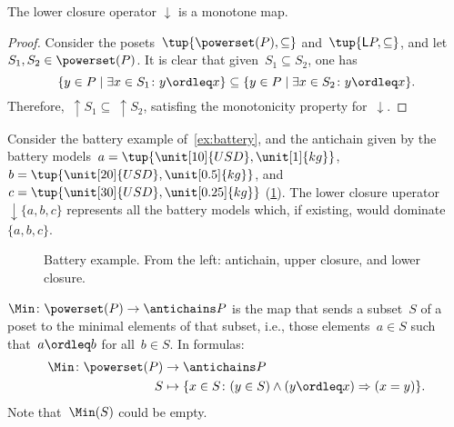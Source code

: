 \begin{lemma}
The lower closure operator $\downarrow$ is a monotone map.
\end{lemma}

\begin{proof}
Consider the posets~$\tup{\powerset(P),\subseteq}$ and~$\tup{\mathsf{L}P,\subseteq}$, and let~$S_1,S_2\in \powerset(P)$. It is clear that given~$S_1\subseteq S_2$, one has
\begin{equation}
    \{y\in P\mid \exists x\in S_1\colon y\ordleq x\} \subseteq \{y\in P\mid \exists x\in S_2\colon y\ordleq x\}.
\end{equation}
Therefore,~$\uparrow S_1\subseteq \ \uparrow S_2$, satisfing the monotonicity property for~$\downarrow$.
\end{proof}



\begin{example}
Consider the battery example of~\cref{ex:battery}, and the antichain given by the battery models~$a=\tup{\unit[10]{USD},\unit[1]{kg}}$,~$b=\tup{\unit[20]{USD},\unit[0.5]{kg}}$, and~$c=\tup{\unit[30]{USD},\unit[0.25]{kg}}$ (\cref{fig:examplebatt}).
The lower closure uperator~$\downarrow\{a,b,c\}$ represents all the battery models which, if existing, would dominate~$\{a,b,c\}$.

\end{example}
\begin{figure}[h!]
    \begin{center}
    \end{center}
    \caption{Battery example. From the left: antichain, upper closure, and lower closure.
        \label{fig:examplebatt}}
\end{figure}


\begin{definition}[Min]
\label{def:Min}
$\Min \colon \powerset(P) \to \antichains P$ is the map that sends a subset~$S$ of a poset to the minimal elements of that subset, i.e., those elements~$a \in S$ such that~$a \ordleq b$ for all~$b \in S$. In formulas:
\begin{equation}
    \begin{aligned}
    \Min \colon \powerset(P) &\to \antichains P\\
    S&\mapsto \{ x\in S\colon (y\in S)\wedge(y\ordleq x)\Rightarrow (x=y)\}.
    \end{aligned}
\end{equation}
Note that~$\Min(S)$ could be empty.
\end{definition}

